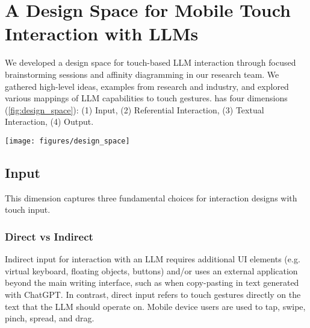 \section{A Design Space for Mobile Touch Interaction with LLMs}
\label{sec:design_space}

We developed a design space for touch-based LLM interaction through focused brainstorming sessions and affinity diagramming \cite{hartson2012ux} in our research team. We gathered high-level ideas, examples from research and industry, and explored various mappings of LLM capabilities to touch gestures. 
 has four dimensions (\cref{fig:design_space}):
(1) Input,
(2) Referential Interaction,
(3) Textual Interaction,
(4) Output.

\begin{figure*}
    \centering
    \texttt{[image: figures/design\_space]}
    \caption{Overview of our design space for mobile touch interaction with generative AI for text, with four dimensions (left to right) and subdimensions (values at vertical lines). Coloured streams indicate the design choices for the two concrete touch gesture controls that we designed, implemented, and evaluated in this paper.}
    \label{fig:design_space}
\end{figure*}

\subsection{Input}
This dimension captures three fundamental choices for interaction designs with touch input. %

\subsubsection{Direct vs Indirect}
Indirect input for interaction with an LLM requires additional UI elements (e.g. virtual keyboard, floating objects, buttons) and/or uses an external application beyond the main writing interface, such as when copy-pasting in text generated with ChatGPT.
In contrast, direct input refers to touch gestures directly on the text that the LLM should operate on. Mobile device users are used to  tap, swipe, pinch, spread, and drag. 

